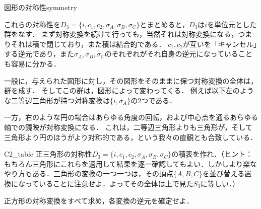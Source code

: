 \documentclass[11pt,a4paper]{jsarticle}
\begin{document}
\begin{rei}{図形の対称性}{symmetry}
\begin{center}
    \end{center}
    
    これらの対称性を$D_3 = \{i, c_1, c_2, \sigma_A, \sigma_B, \sigma_C\}$とまとめると，$D_3$は$i$を単位元とした群をなす．
    まず対称変換を続けて行っても，当然それは対称変換になる，つまりそれは積で閉じており，また積は結合的である．
    $c_1, c_2$が互いを「キャンセル」する逆元であり，また$\sigma_A, \sigma_B, \sigma_C$のそれぞれがそれ自身の逆元になっていることも容易に分かる．
    
    一般に，与えられた図形に対し，その図形をそのままに保つ対称変換の全体は，群を成す．
    そしてこの群は，図形によって変わってくる．
    例えば以下左のような二等辺三角形が持つ対称変換は$\{i, \sigma_A\}$の2つである．
    \begin{center}
    \end{center}
    一方，右のような円の場合はあらゆる角度の回転，および中心点を通るあらゆる軸での鏡映が対称変換になる．
    これは，二等辺三角形よりも三角形が，そして三角形より円のほうがより対称的である，という我々の直観とも合致している．

\end{rei}

\begin{renshu}{}{C2_table}
    正三角形の対称性$D_3 = \{i, c_1, c_2, \sigma_A, \sigma_B, \sigma_C\}$の積表を作れ．（ヒント：もちろん三角形にこれらを適用して結果を逐一確認してもよい．しかしより楽なやり方もある．三角形の変換の一つ一つは，その頂点$\{A, B, C\}$を並び替える置換になっていることに注意せよ．よってその全体は上で見た$S_3$に等しい．）
\end{renshu}
 
\begin{renshu}{}{}
    正方形の対称変換をすべて求め，各変換の逆元を確定せよ．
\end{renshu}
\end{document}
